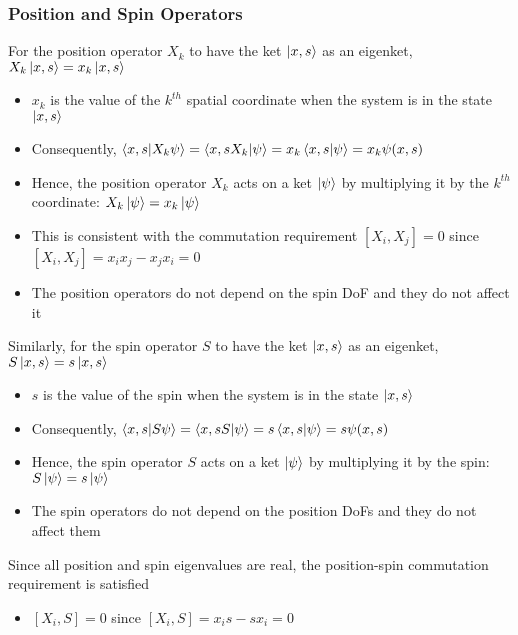 \documentclass[8pt,t,mathserif,aspectratio=169]{beamer}
\begin{document}
\begin{frame}
  \frametitle{Position and Spin Operators}
  \vspace{1mm}
  For the position operator $X_k$ to have the ket $\ket{x,s}$ as an eigenket, $X_k \ket{x,s} = x_k \ket{x,s}$
  \begin{itemize}
    \item $x_k$ is the value of the $k^{th}$ spatial coordinate when the system is in the state $\ket{x,s}$
    \item Consequently, $\braket{x,s}{X_k \psi} = \bra{x,s X_k} \ket{\psi} = x_k \braket{x,s}{\psi} = x_k \psi(x,s)$
    \item Hence, the position operator $X_k$ acts on a ket $\ket{\psi}$ by multiplying it by the $k^{th}$ coordinate: $X_k \ket{\psi} = x_k \ket{\psi}$
    \item This is consistent with the commutation requirement $[X_i,X_j] = 0$ since $[X_i,X_j] = x_i x_j - x_j x_i = 0$
    \item The position operators do not depend on the spin DoF and they do not affect it
  \end{itemize}
  Similarly, for the spin operator $S$ to have the ket $\ket{x,s}$ as an eigenket, $S \ket{x,s} = s \ket{x,s}$
  \begin{itemize}
    \item $s$ is the value of the spin when the system is in the state $\ket{x,s}$
    \item Consequently, $\braket{x,s}{S \psi} = \bra{x,s S} \ket{\psi} = s \braket{x,s}{\psi} = s \psi(x,s)$
    \item Hence, the spin operator $S$ acts on a ket $\ket{\psi}$ by multiplying it by the spin: $S \ket{\psi} = s \ket{\psi}$
    \item The spin operators do not depend on the position DoFs and they do not affect them
  \end{itemize}
  Since all position and spin eigenvalues are real, the position-spin commutation requirement is satisfied
  \begin{itemize}
    \item $[X_i,S] = 0$ since $[X_i,S] = x_i s - s x_i = 0$
  \end{itemize}
\end{frame}
\end{document}
